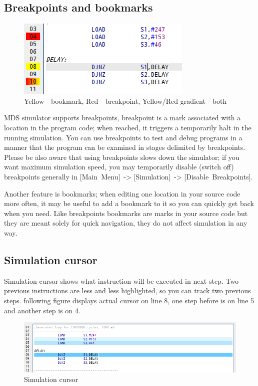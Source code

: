     \subsection{Breakpoints and bookmarks}
        \begin{figure}
            \centering{}
                \includegraphics[width=.35\textwidth]{img/breakpoints1.png}
                \caption{Yellow - bookmark, Red - breakpoint, Yellow/Red gradient - both}
        \end{figure}
        MDS simulator supports breakpoints, breakpoint is a mark associated with a location in the program code; when
        reached, it triggers a temporarily halt in the running simulation. You can use breakpoints to test and debug
        programs in a manner that the program can be examined in stages delimited by breakpoints. Please be also aware
        that using breakpoints slows down the simulator; if you want maximum simulation speed, you may temporarily
        disable (switch off) breakpoints generally in [Main~Menu]~-> [Simulation]~-> [Disable~Breakpoints].

        Another feature is bookmarks; when editing one location in your source code more often, it may be useful to add
        a bookmark to it so you can quickly get back when you need. Like breakpoints bookmarks are marks in your source
        code but they are meant solely for quick navigation, they do not affect simulation in any way.

    \subsection{Simulation cursor}
        Simulation cursor shows what instruction will be executed in next step. Two previous instructions are less and
        less highlighted, so you can track two previous steps. following figure displays actual cursor on line 8, one
        step before is on line 5 and another step is on 4.
        \begin{figure}[h!]
            \centering
            \includegraphics[width=\textwidth]{img/simulationcursor1.png}
            \caption{Simulation cursor}
        \end{figure}

